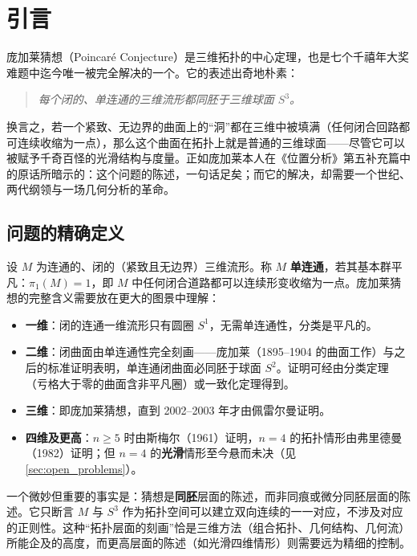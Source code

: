 \section{引言}\label{sec:introduction}

庞加莱猜想（Poincar\'e Conjecture）是三维拓扑的中心定理，也是七个千禧年大奖难题中迄今唯一被完全解决的一个。它的表述出奇地朴素：

\begin{quote}
    \textit{每个闭的、单连通的三维流形都同胚于三维球面 $S^3$。}
\end{quote}

换言之，若一个紧致、无边界的曲面上的“洞”都在三维中被填满（任何闭合回路都可连续收缩为一点），那么这个曲面在拓扑上就是普通的三维球面——尽管它可以被赋予千奇百怪的光滑结构与度量。正如庞加莱本人在《位置分析》第五补充篇\cite{poincare1904}中的原话所暗示的：这个问题的陈述，一句话足矣；而它的解决，却需要一个世纪、两代纲领与一场几何分析的革命。

\subsection{问题的精确定义}

设 $M$ 为连通的、闭的（紧致且无边界）三维流形。称 $M$ \textbf{单连通}，若其基本群平凡：$\pi_1(M) = 1$，即 $M$ 中任何闭合道路都可以连续形变收缩为一点。庞加莱猜想的完整含义需要放在更大的图景中理解：

\begin{itemize}
    \item \textbf{一维}：闭的连通一维流形只有圆圈 $S^1$，无需单连通性，分类是平凡的。
    \item \textbf{二维}：闭曲面由单连通性完全刻画——庞加莱（1895--1904 的曲面工作）与之后的标准证明表明，单连通闭曲面必同胚于球面 $S^2$。证明可经由分类定理（亏格大于零的曲面含非平凡圈）或一致化定理得到。
    \item \textbf{三维}：即庞加莱猜想，直到 2002--2003 年才由佩雷尔曼证明\cite{perelman2002entropy,perelman2003surgery,perelman2003extinction}。
    \item \textbf{四维及更高}：$n \geq 5$ 时由斯梅尔（1961）\cite{smale1961}证明，$n = 4$ 的拓扑情形由弗里德曼（1982）\cite{freedman1982}证明；但 $n = 4$ 的\textbf{光滑}情形至今悬而未决（见\cref{sec:open_problems}）。
\end{itemize}

一个微妙但重要的事实是：猜想是\textbf{同胚}层面的陈述，而非同痕或微分同胚层面的陈述。它只断言 $M$ 与 $S^3$ 作为拓扑空间可以建立双向连续的一一对应，不涉及对应的正则性。这种“拓扑层面的刻画”恰是三维方法（组合拓扑、几何结构、几何流）所能企及的高度，而更高层面的陈述（如光滑四维情形）则需要远为精细的控制。

